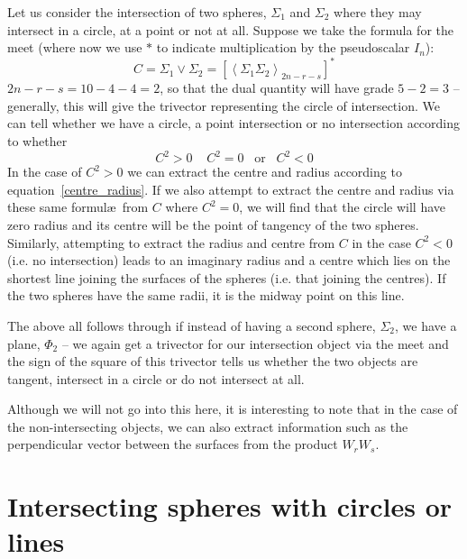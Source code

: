 Let us consider the intersection of two spheres, $\Sigma_1$ and
$\Sigma_2$ where they may intersect in a circle, at a point or not
at all. Suppose we take the formula for the meet (where now we use
$*$ to indicate multiplication by the pseudoscalar $I_n$):
%
\begin{equation}
C = \Sigma_1 \vee \Sigma_2 = \left[\left< \Sigma_1 \Sigma_2
\right>_{2n-r-s}\right]^*
\end{equation}
%
$2n-r-s = 10-4-4=2$, so that the dual quantity will have
grade $5-2=3$ -- generally, this will give the trivector
representing the circle of intersection. We can tell
whether we have a circle, a point intersection or no
intersection according to whether
%
\begin{equation}
C^2 >0 \;\;\;\; C^2 = 0 \;\;\;\mbox{or}\;\;\; C^2<0
\end{equation}
%
In the case of $C^2>0$ we can extract the centre and radius
according to equation~\ref{centre_radius}. If we also attempt to
extract the centre and radius via these same formul\ae\ from $C$
where $C^2=0$, we will find that the circle will have zero radius
and its centre will be the point of tangency of the two spheres.
Similarly, attempting to extract the radius and centre from $C$ in
the case $C^2<0$ (i.e. no intersection) leads to an imaginary
radius and a centre which lies on the shortest line joining the
surfaces of the spheres (i.e. that joining the centres). If the
two spheres have the same radii, it is the midway point on this
line.

The above all follows through if instead of having a
second sphere, $\Sigma_2$, we have a plane, $\Phi_2$ --
we again get a trivector for our intersection object via the meet and the sign
of the square of this trivector tells us whether the two objects are tangent,
intersect in a circle or do not intersect at all.

Although we will not go into this here, it is interesting
to note that in the case of the non-intersecting objects,
we can also extract information such as the perpendicular
vector between the surfaces from the product $W_rW_s$.


\section{Intersecting spheres with circles or lines}


